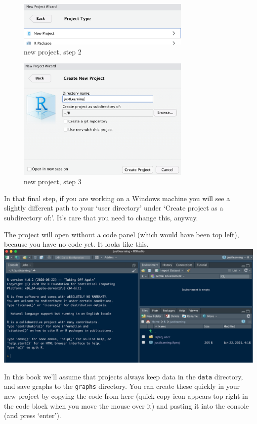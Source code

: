 \documentclass[
]{book}
\begin{document}
\begin{figure}
\centering
\includegraphics[width=0.75\textwidth,height=\textheight]{images/new project 2.png}
\caption{new project, step 2}
\end{figure}

\begin{figure}
\centering
\includegraphics[width=0.75\textwidth,height=\textheight]{images/new project 3.png}
\caption{new project, step 3}
\end{figure}

In that final step, if you are working on a Windows machine you will see a slightly different path to your `user directory' under `Create project as a subdirectory of:'. It's rare that you need to change this, anyway.

The project will open without a code panel (which would have been top left), because you have no code yet. It looks like this.
\includegraphics{images/NewJustLearning.png}

In this book we'll assume that projects always keep data in the \texttt{data} directory, and save graphs to the \texttt{graphs} directory. You can create these quickly in your new project by copying the code from here (quick-copy icon appears top right in the code block when you move the mouse over it) and pasting it into the console (and press `enter').
\end{document}

